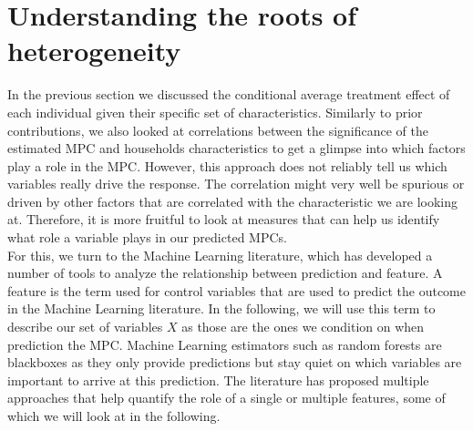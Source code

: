 \section{Understanding the roots of heterogeneity} \label{subsec:roots_of_heterogeneity}
In the previous section we discussed the conditional average treatment effect of each individual given their specific set of characteristics. Similarly to prior contributions, we also looked at correlations between the significance of the estimated MPC and households characteristics to get a glimpse into which factors play a role in the MPC. However, this approach does not reliably tell us which variables really drive the response. The correlation might very well be spurious or driven by other factors that are correlated with the characteristic we are looking at. Therefore, it is more fruitful to look at measures that can help us identify what role a variable plays in our predicted MPCs. \\
For this, we turn to the Machine Learning literature, which has developed a number of tools to analyze the relationship between prediction and feature. A feature is the term used for control variables that are used to predict the outcome in the Machine Learning literature. In the following, we will use this term to describe our set of variables $X$ as those are the ones we condition on when prediction the MPC. Machine Learning estimators such as random forests are blackboxes as they only provide predictions but stay quiet on which variables are important to arrive at this prediction. The literature has proposed multiple approaches that help quantify the role of a single or multiple features, some of which we will look at in the following. \\

